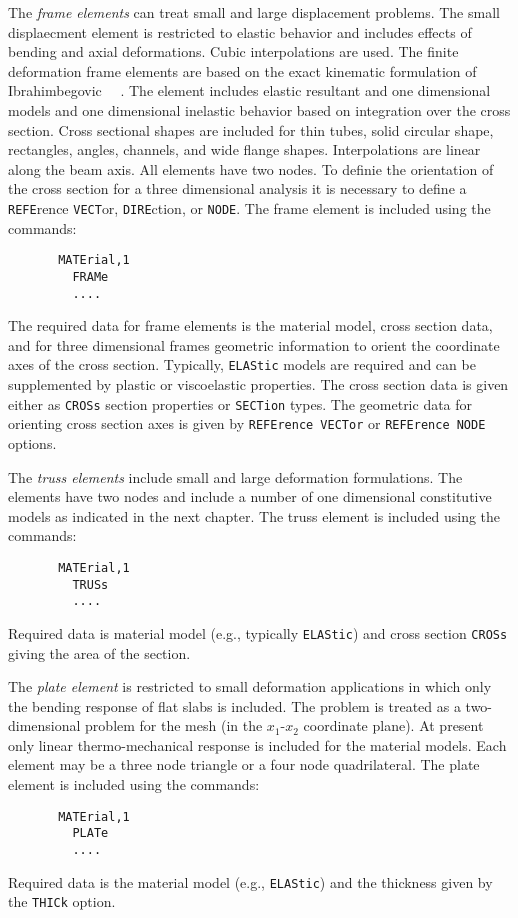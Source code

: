 The {\it frame elements} can treat small and large displacement problems.
The small displaecment element is restricted to elastic behavior
and includes effects of bending and axial deformations.  Cubic interpolations
are used.
The finite deformation frame elements are based on the exact kinematic
formulation of Ibrahimbegovic ~~\cite{adnan98a}.
The element includes elastic resultant and one dimensional
models and one dimensional inelastic behavior based on integration
over the cross
section.  Cross sectional shapes are included for thin tubes, solid circular
shape, rectangles, angles, channels, and wide flange shapes.
Interpolations are linear along the beam axis.
All elements have
two nodes.  To definie the orientation of the cross section for a three
dimensional analysis it is necessary to define a \texttt{REFE}r\-ence
\texttt{VECT}or, \texttt{DIRE}c\-tion, or \texttt{NODE}.
The frame element is included using the commands:
\begin{verbatim}
       MATErial,1
         FRAMe
		 ....
\end{verbatim}
The required data for frame elements is the material model, cross section
data, and for three dimensional frames geometric information to orient the
coordinate axes of the cross section.  Typically, \texttt{ELAStic} models are
required and can be supplemented by plastic or viscoelastic properties.  The
cross section data is given either as \texttt{CROSs} section properties or
\texttt{SECTion} types.  The geometric data for orienting cross section axes
is given by \texttt{REFErence VECTor} or \texttt{REFErence NODE} options.

The {\it truss elements} include small and large deformation formulations.
The elements have two nodes and include a number of one dimensional
constitutive models as indicated in the next chapter.
The truss element is included using the commands:
\begin{verbatim}
       MATErial,1
         TRUSs
		 ....
\end{verbatim}
Required data is material model (e.g., typically \texttt{ELAStic}) and cross
section \texttt{CROSs} giving the area of the section.

The {\it plate element} is restricted to small deformation applications
in which only the bending response of flat slabs is included.  The problem
is treated as a two-dimensional problem for the mesh (in the $x_1$-$x_2$
coordinate plane).  At present only
linear thermo-mechanical response is included for the material models.
Each element may be a three node triangle or a four node quadrilateral.
The plate element is included using the commands:
\begin{verbatim}
       MATErial,1
         PLATe
		 ....
\end{verbatim}
Required data is the material model (e.g., \texttt{ELAStic}) and the thickness
given by the \texttt{THICk} option.


